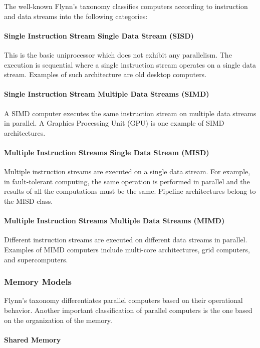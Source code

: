 The well-known Flynn's taxonomy \cite{flynn:1972} classifies computers according to instruction and data streams into the following categories:

\paragraph{Single Instruction Stream Single Data Stream (SISD)} This is the basic uniprocessor which does not exhibit any parallelism. The execution is sequential where a single instruction stream operates on a single data stream. Examples of such architecture are old desktop computers.

\paragraph{Single Instruction Stream Multiple Data Streams (SIMD)} A SIMD computer executes the same instruction stream on multiple data streams in parallel. A Graphics Processing Unit (GPU) is one example of SIMD architectures.

\paragraph{Multiple Instruction Streams Single Data Stream (MISD)} Multiple instruction streams are executed on a single data stream. For example, in fault-tolerant computing, the same operation is performed in parallel and the results of all the computations must be the same. Pipeline architectures belong to the MISD class.

\paragraph{Multiple Instruction Streams Multiple Data Streams (MIMD)} Different instruction streams are executed on different data streams in parallel. Examples of MIMD computers include multi-core architectures, grid computers, and supercomputers.

\subsubsection{Memory Models}

Flynn's taxonomy differentiates parallel computers based on their operational behavior. Another important classification of parallel computers is the one based on the organization of the memory.

\paragraph{Shared Memory}

